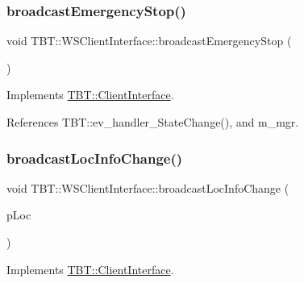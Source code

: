 \subsubsection{\texorpdfstring{broadcast\+Emergency\+Stop()}{broadcastEmergencyStop()}}
{\footnotesize\ttfamily void T\+B\+T\+::\+W\+S\+Client\+Interface\+::broadcast\+Emergency\+Stop (\begin{DoxyParamCaption}\item[{void}]{ }\end{DoxyParamCaption})\hspace{0.3cm}{\ttfamily [virtual]}}



Implements \hyperlink{classTBT_1_1ClientInterface_a8d19220baccb47a7c9f45d0288bebcb8_a8d19220baccb47a7c9f45d0288bebcb8}{T\+B\+T\+::\+Client\+Interface}.



References T\+B\+T\+::ev\+\_\+handler\+\_\+\+State\+Change(), and m\+\_\+mgr.

\mbox{\label{classTBT_1_1WSClientInterface_a39806206461815c06c517b66d122b4db_a39806206461815c06c517b66d122b4db}} 
\subsubsection{\texorpdfstring{broadcast\+Loc\+Info\+Change()}{broadcastLocInfoChange()}}
{\footnotesize\ttfamily void T\+B\+T\+::\+W\+S\+Client\+Interface\+::broadcast\+Loc\+Info\+Change (\begin{DoxyParamCaption}\item[{\hyperlink{classTBT_1_1LocDecoder}{Loc\+Decoder} $\ast$}]{p\+Loc }\end{DoxyParamCaption})\hspace{0.3cm}{\ttfamily [virtual]}}



Implements \hyperlink{classTBT_1_1ClientInterface_aaede3709fa0dcb23743f43d9c1a5ab04_aaede3709fa0dcb23743f43d9c1a5ab04}{T\+B\+T\+::\+Client\+Interface}.

\mbox{\label{classTBT_1_1WSClientInterface_ad1c7f413c63f04b04d6e20f5d154d1fd_ad1c7f413c63f04b04d6e20f5d154d1fd}} 

